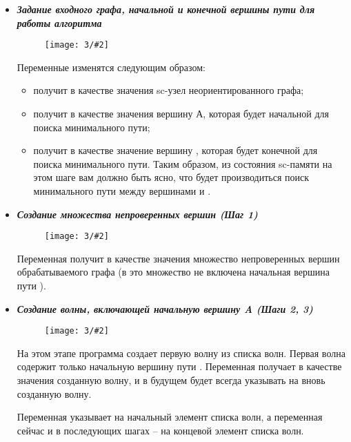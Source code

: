 \newenvironment{algostep}[3]
{
  \newpage
  \label{astep:#2}
  \item \emph{\textbf{#1}}
  
  \begin{figure}[h!]
    \centering
    \texttt{[image: 3/\#2]}
  \end{figure}
}
{
}

\begin{itemize}
\begin{algostep}{Задание входного графа, начальной и конечной вершины
    пути для работы алгоритма}{S1_Input_graph}{0.8}
  
  Переменные изменятся следующим образом:

  \begin{itemize}
  \item {} получит в качестве значения sc-узел
    неориентированного графа;
  \item {} получит в качестве
    значения вершину А, которая будет начальной для поиска минимального
    пути;
  \item {} получит в качестве значение вершину ,
    которая будет конечной для поиска минимального пути.  Таким образом,
    из состояния sc-памяти на этом шаге вам должно быть ясно, что будет
    производиться поиск минимального пути между вершинами  и .
  \end{itemize}
\end{algostep}


\begin{algostep}{Создание множества непроверенных вершин (Шаг
    1)}{S2_Create_unchecked_vertexes_set}{0.8}

  Переменная  получит в качестве значения
  множество непроверенных вершин обрабатываемого графа (в это множество
  не включена начальная вершина пути ).
\end{algostep}


\begin{algostep}{Создание волны, включающей начальную вершину A (Шаги
    2, 3)}{S3_Create_1st_wave}{0.8}

  На этом этапе программа создает первую волну из списка волн. Первая
  волна содержит только начальную вершину пути . Переменная
   получает в качестве значения созданную волну, и в
  будущем будет всегда указывать на вновь созданную волну.

  Переменная  указывает на начальный элемент
  списка волн, а переменная  сейчас и в
  последующих шагах – на концевой элемент списка волн.
\end{algostep}



\end{itemize}
